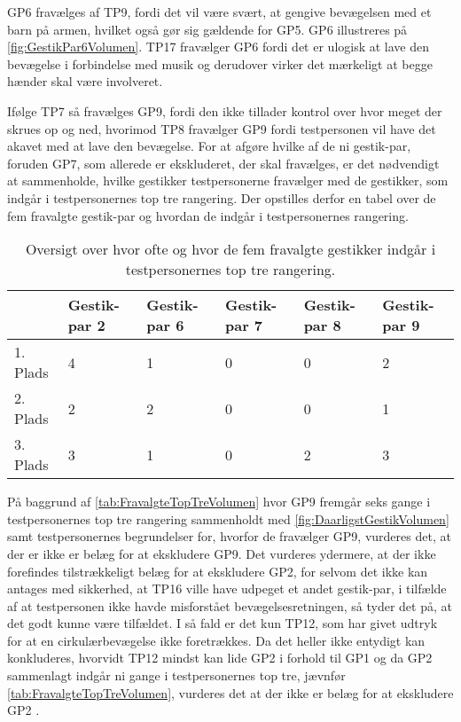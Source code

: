 GP6 fravælges af TP9, fordi det vil være svært, at gengive bevægelsen med et barn på armen, hvilket også gør sig gældende for GP5. GP6 illustreres på \autoref{fig:GestikPar6Volumen}. TP17 fravælger GP6 fordi det er ulogisk at lave den bevægelse i forbindelse med musik og derudover virker det mærkeligt at begge hænder skal være involveret. 

Ifølge TP7 så fravælges GP9, fordi den ikke tillader kontrol over hvor meget der skrues op og ned, hvorimod TP8 fravælger GP9 fordi testpersonen vil have det akavet med at lave den bevægelse.\blankline
%
For at afgøre hvilke af de ni gestik-par, foruden GP7, som allerede er ekskluderet, der skal fravælges, er det nødvendigt at sammenholde, hvilke gestikker testpersonerne fravælger med de gestikker, som indgår i testpersonernes top tre rangering. Der opstilles derfor en tabel over de fem fravalgte gestik-par og hvordan de indgår i testpersonernes rangering.    
%
\begin{table}[H]
	\centering
	\begin{tabular}{ | p{1.5cm} | p{2.1cm} | p{2.1cm} | p{2.1cm} | p{2.1cm} | p{2.1cm} |}
	\hline
		 & Gestik-par 2 & Gestik-par 6 & Gestik-par 7 & Gestik-par 8 & Gestik-par 9 \\ \hline
		1. Plads & 4 & 1 & 0 & 0 & 2\\ \hline
		2. Plads & 2 & 2 & 0 & 0 & 1\\ \hline
		3. Plads & 3 & 1 & 0 & 2 & 3\\ \hline
	\end{tabular}
	\caption{Oversigt over hvor ofte og hvor de fem fravalgte gestikker indgår i testpersonernes top tre rangering.}
	\label{tab:FravalgteTopTreVolumen}
\end{table}
\noindent
%
På baggrund af \autoref{tab:FravalgteTopTreVolumen} hvor GP9 fremgår seks gange i testpersonernes top tre rangering sammenholdt med \autoref{fig:DaarligstGestikVolumen} samt testpersonernes begrundelser for, hvorfor de fravælger GP9, vurderes det, at der er ikke er belæg for at ekskludere GP9. Det vurderes ydermere, at der ikke forefindes tilstrækkeligt belæg for at ekskludere GP2, for selvom det ikke kan antages med sikkerhed, at TP16 ville have udpeget et andet gestik-par, i tilfælde af at testpersonen ikke havde misforstået bevægelsesretningen, så tyder det på, at det godt kunne være tilfældet. I så fald er det kun TP12, som har givet udtryk for at en cirkulærbevægelse ikke foretrækkes. Da det heller ikke entydigt kan konkluderes, hvorvidt TP12 mindst kan lide GP2 i forhold til GP1 og da GP2 sammenlagt indgår ni gange i testpersonernes top tre, jævnfør \autoref{tab:FravalgteTopTreVolumen}, vurderes det at der ikke er belæg for at ekskludere GP2 .
